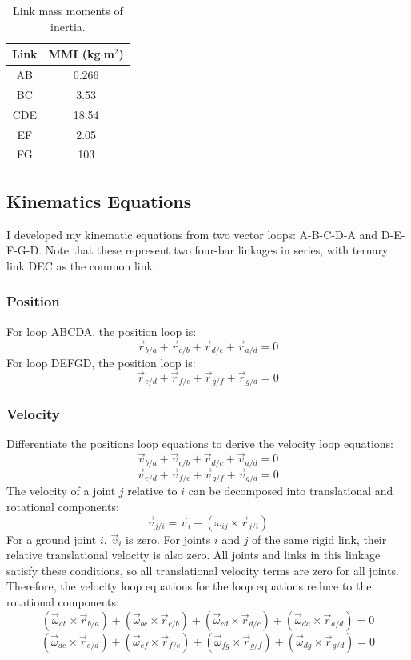 \documentclass[12pt]{article}
\begin{document}
\begin{table}[H] %
  \begin{center}
    \begin{tabular}{ c|c }  %
      Link & MMI (kg$\cdot$m$^{2}$) \\
      \hline
      AB & 0.266   \\
      BC & 3.53   \\
      CDE & 18.54   \\
      EF & 2.05 \\
      FG & 103 \\
    \end{tabular}
  \end{center}\caption{Link mass moments of inertia.}\label{tab:link-mmi}
\end{table}

\subsection{Kinematics Equations}%
\label{eqns.kinematics}

I developed my kinematic equations from two vector loops: A-B-C-D-A and D-E-F-G-D. Note that these represent two four-bar linkages in series, with ternary link DEC as the common link.

\subsubsection{Position}%
\label{eqns.kinematics.position}

For loop ABCDA, the position loop is:
\[ \vec{r}_{b/a} + \vec{r}_{c/b} + \vec{r}_{d/c} + \vec{r}_{a/d} = 0 \]
For loop DEFGD, the position loop is:
\[ \vec{r}_{e/d} + \vec{r}_{f/e} + \vec{r}_{g/f} + \vec{r}_{g/d} = 0 \]

\subsubsection{Velocity}%
\label{eqns.kinematics.velocity}

Differentiate the positions loop equations to derive the velocity loop equations:
\[ \vec{v}_{b/a} + \vec{v}_{c/b} + \vec{v}_{d/c} + \vec{v}_{a/d} = 0 \]
\[ \vec{v}_{e/d} + \vec{v}_{f/e} + \vec{v}_{g/f} + \vec{v}_{g/d} = 0 \]
The velocity of a joint $j$ relative to $i$ can be decomposed into translational and rotational components:
\[ \vec{v}_{j/i} = \vec{v}_{i} + (\omega_{ij}\times \vec{r}_{j/i}) \]
For a ground joint $i$, $\vec{v}_{i}$ is zero. For joints $i$ and $j$ of the same rigid link, their relative translational velocity is also zero. All joints and links in this linkage satisfy these conditions, so all translational velocity terms are zero for all joints. Therefore, the velocity loop equations for the loop equations reduce to the rotational components:
\[ (\vec{\omega}_{ab}\times \vec{r}_{b/a}) + (\vec{\omega}_{bc}\times \vec{r}_{c/b}) + (\vec{\omega}_{cd}\times \vec{r}_{d/c}) + (\vec{\omega}_{da}\times \vec{r}_{a/d}) = 0 \]
\[ (\vec{\omega}_{de}\times \vec{r}_{e/d}) + (\vec{\omega}_{ef}\times \vec{r}_{f/e}) + (\vec{\omega}_{fg}\times \vec{r}_{g/f}) + (\vec{\omega}_{dg}\times \vec{r}_{g/d}) = 0 \]\\
\end{document}
